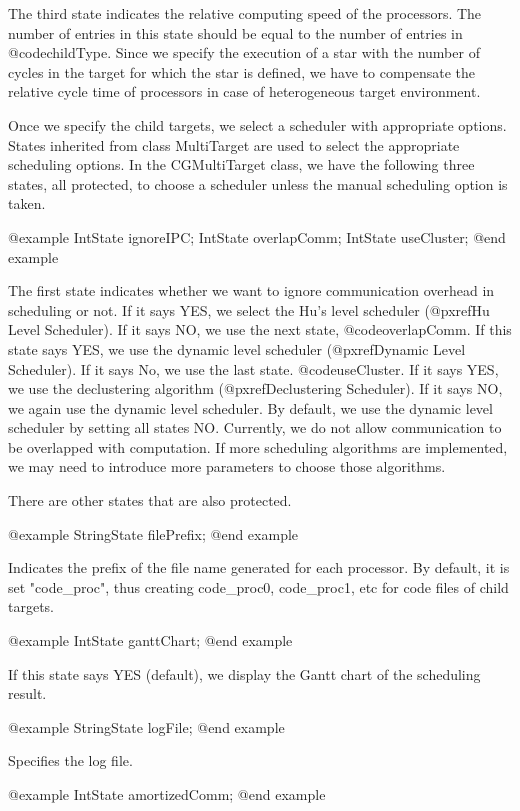 The third state indicates the relative computing speed of the processors.
The number of entries in this state should be equal to the number of
entries in @code{childType}. Since we specify the execution of a star
with the number of cycles in the target for which the star is defined,
we have to compensate the relative cycle time of processors in case of
heterogeneous target environment.

Once we specify the child targets, we select a scheduler with appropriate
options. States inherited from class MultiTarget are used to select
the appropriate scheduling options. In the CGMultiTarget class, we have
the following three states, all protected, to choose a scheduler unless
the manual scheduling option is taken.

@example
IntState ignoreIPC;
IntState overlapComm;
IntState useCluster;
@end example

The first state indicates whether we want to ignore communication overhead
in scheduling or not. If it says YES, we select the Hu's level scheduler
(@pxref{Hu Level Scheduler}). If it says NO, we use the next state,
@code{overlapComm}. If this state says YES, we use the dynamic level scheduler
(@pxref{Dynamic Level Scheduler}). If it says No, we use the last state.
@code{useCluster}. If it says YES, we use the declustering algorithm
(@pxref{Declustering Scheduler}). If it says NO, we again use the dynamic
level scheduler. By default, we use the dynamic level scheduler by setting
all states NO. Currently, we do not allow communication to be overlapped
with computation. If more scheduling algorithms are implemented, we may need
to introduce more parameters to choose those algorithms. 

There are other states that are also protected.

@example
StringState filePrefix;
@end example

Indicates the prefix of the file name generated for each processor.
By default, it is set "code_proc", thus creating code_proc0, code_proc1, etc
for code files of child targets.

@example
IntState ganttChart;
@end example

If this state says YES (default), we display the Gantt chart of the 
scheduling result. 

@example
StringState logFile;
@end example

Specifies the log file.

@example
IntState amortizedComm;
@end example

